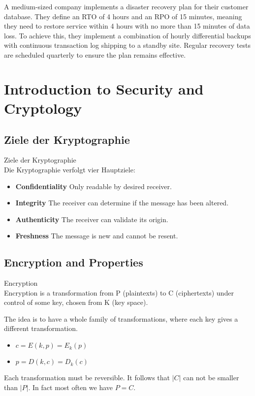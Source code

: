 \begin{example}
A medium-sized company implements a disaster recovery plan for their customer database. They define an RTO of 4 hours and an RPO of 15 minutes, meaning they need to restore service within 4 hours with no more than 15 minutes of data loss. To achieve this, they implement a combination of hourly differential backups with continuous transaction log shipping to a standby site. Regular recovery tests are scheduled quarterly to ensure the plan remains effective.
\end{example}

\section{Introduction to Security and Cryptology}

\subsection{Ziele der Kryptographie}

\begin{definition}{Ziele der Kryptographie}\\
    Die Kryptographie verfolgt vier Hauptziele:
    \begin{itemize}
        \item \textbf{Confidentiality} Only readable by desired receiver.
        \item \textbf{Integrity} The receiver can determine if the message has been altered.
        \item \textbf{Authenticity} The receiver can validate its origin.
        \item \textbf{Freshness} The message is new and cannot be resent.
    \end{itemize}
\end{definition}

\subsection{Encryption and Properties}

\begin{concept}{Encryption}\\
    Encryption is a transformation from P (plaintexts) to C (ciphertexts) under control of some key, chosen from K (key space).
    
    The idea is to have a whole family of transformations, where each key gives a different transformation.
    \begin{itemize}
        \item $c = E(k, p) = E_k(p)$
        \item $p = D(k, c) = D_k(c)$
    \end{itemize}
    
    Each transformation must be reversible. It follows that $|C|$ can not be smaller than $|P|$. In fact most often we have $P = C$.
\end{concept}

